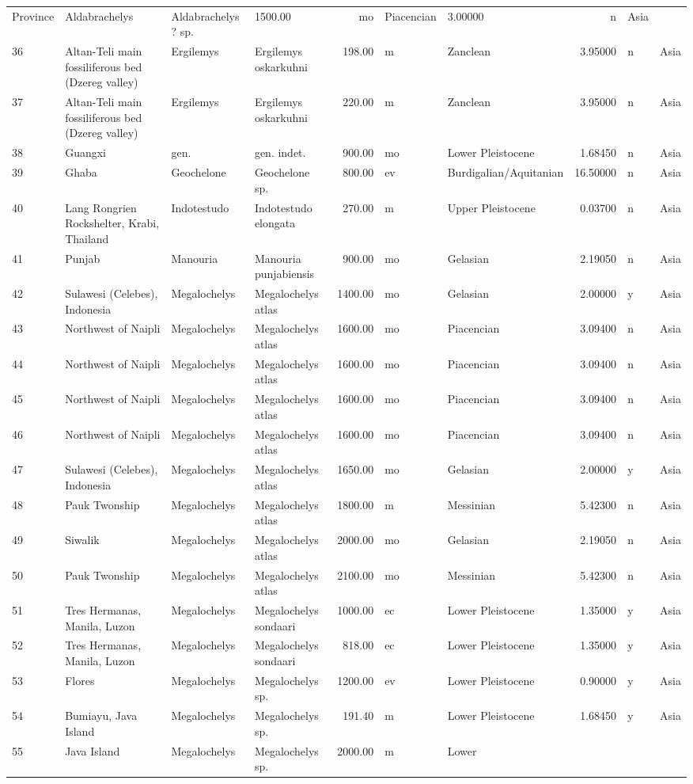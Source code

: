 \documentclass[]{article}
\begin{document}
\begin{longtable}[]{@{}llllrllrll@{}}
Province & Aldabrachelys & Aldabrachelys ? sp. & 1500.00 & mo &
Piacencian & 3.00000 & n & Asia\tabularnewline
36 & Altan-Teli main fossiliferous bed (Dzereg valley) & Ergilemys &
Ergilemys oskarkuhni & 198.00 & m & Zanclean & 3.95000 & n &
Asia\tabularnewline
37 & Altan-Teli main fossiliferous bed (Dzereg valley) & Ergilemys &
Ergilemys oskarkuhni & 220.00 & m & Zanclean & 3.95000 & n &
Asia\tabularnewline
38 & Guangxi & gen. & gen. indet. & 900.00 & mo & Lower Pleistocene &
1.68450 & n & Asia\tabularnewline
39 & Ghaba & Geochelone & Geochelone sp. & 800.00 & ev &
Burdigalian/Aquitanian & 16.50000 & n & Asia\tabularnewline
40 & Lang Rongrien Rockshelter, Krabi, Thailand & Indotestudo &
Indotestudo elongata & 270.00 & m & Upper Pleistocene & 0.03700 & n &
Asia\tabularnewline
41 & Punjab & Manouria & Manouria punjabiensis & 900.00 & mo & Gelasian
& 2.19050 & n & Asia\tabularnewline
42 & Sulawesi (Celebes), Indonesia & Megalochelys & Megalochelys atlas &
1400.00 & mo & Gelasian & 2.00000 & y & Asia\tabularnewline
43 & Northwest of Naipli & Megalochelys & Megalochelys atlas & 1600.00 &
mo & Piacencian & 3.09400 & n & Asia\tabularnewline
44 & Northwest of Naipli & Megalochelys & Megalochelys atlas & 1600.00 &
mo & Piacencian & 3.09400 & n & Asia\tabularnewline
45 & Northwest of Naipli & Megalochelys & Megalochelys atlas & 1600.00 &
mo & Piacencian & 3.09400 & n & Asia\tabularnewline
46 & Northwest of Naipli & Megalochelys & Megalochelys atlas & 1600.00 &
mo & Piacencian & 3.09400 & n & Asia\tabularnewline
47 & Sulawesi (Celebes), Indonesia & Megalochelys & Megalochelys atlas &
1650.00 & mo & Gelasian & 2.00000 & y & Asia\tabularnewline
48 & Pauk Twonship & Megalochelys & Megalochelys atlas & 1800.00 & m &
Messinian & 5.42300 & n & Asia\tabularnewline
49 & Siwalik & Megalochelys & Megalochelys atlas & 2000.00 & mo &
Gelasian & 2.19050 & n & Asia\tabularnewline
50 & Pauk Twonship & Megalochelys & Megalochelys atlas & 2100.00 & mo &
Messinian & 5.42300 & n & Asia\tabularnewline
51 & Tres Hermanas, Manila, Luzon & Megalochelys & Megalochelys sondaari
& 1000.00 & ec & Lower Pleistocene & 1.35000 & y & Asia\tabularnewline
52 & Tres Hermanas, Manila, Luzon & Megalochelys & Megalochelys sondaari
& 818.00 & ec & Lower Pleistocene & 1.35000 & y & Asia\tabularnewline
53 & Flores & Megalochelys & Megalochelys sp. & 1200.00 & ev & Lower
Pleistocene & 0.90000 & y & Asia\tabularnewline
54 & Bumiayu, Java Island & Megalochelys & Megalochelys sp. & 191.40 & m
& Lower Pleistocene & 1.68450 & y & Asia\tabularnewline
55 & Java Island & Megalochelys & Megalochelys sp. & 2000.00 & m & Lower

\end{longtable}
\end{document}
